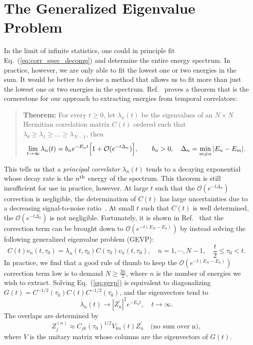 \section{The Generalized Eigenvalue Problem}
In the limit of infinite statistics, one could in principle fit Eq.~(\ref{eq:corr_spec_decomp}) and determine the entire energy spectrum. In practice, however, we are only able to fit the lowest one or two energies in the sum. It would be better to devise a method that allows us to fit more than just the lowest one or two energies in the spectrum. Ref.~\cite{Luscher:1990ck} proves a theorem that is the cornerstone for our approach to extracting energies from temporal correlators:
\begin{quote}
    \textbf{Theorem:} For every $t\geq 0$, 
    let $\lambda_n(t)$
    be the eigenvalues of an $N\times N$ Hermitian correlation matrix $C(t)$ ordered 
    such that
    $\lambda_0\geq \lambda_1\geq \dots\geq \lambda_{N-1}$, then 
    \begin{equation}
       \lim_{t\rightarrow\infty}\lambda_n(t)= b_n e^{-E_n t}\Bigl[1
     + \mathcal O(e^{-t\Delta_n})\Bigr],\qquad b_n>0,\quad
      \Delta_n = \min_{m\neq n}\vert E_n-E_m\vert.
    \label{eq:thmlarget}
    \end{equation}
\end{quote}
This tells us that a \emph{principal correlator} $\lambda_n(t)$ tends to a decaying exponential whose decay rate is the $n^{\rm{th}}$ energy of the spectrum. This theorem is still insufficient for use in practice, however. At large $t$ such that the $\mathcal O(e^{-t\Delta_n})$ correction is negligible, the determination of $C(t)$ has large uncertainties due to a decreasing signal-to-noise ratio~\cite{Lepage:1989hd}. At small $t$ such that $C(t)$ is well determined, the $\mathcal O(e^{-t\Delta_n})$ is not negligible. Fortunately, it is shown in Ref.~\cite{Luscher:1990ck} that the correction term can be brought down to $\mathcal O(e^{-t(E_N - E_n)})$ by instead solving the following generalized eigenvalue problem (GEVP):
\begin{equation}\label{eq:gevp}
    C(t) v_{n}\left(t, \tau_{0}\right)=\lambda_{n}\left(t, \tau_{0}\right) C\left(\tau_{0}\right) v_{n}\left(t, \tau_{0}\right), \quad n=1, \cdots, N-1, \quad \frac{t}{2} \leq \tau_0 < t.
\end{equation}
In practice, we find that a good rule of thumb to keep the $\mathcal O(e^{-t(E_N - E_n)})$ correction term low is to demand $N \geq \frac{3n}{2}$, where $n$ is the number of energies we wish to extract. Solving Eq.~(\ref{eq:gevp}) is equivalent to diagonalizing $G(t) = C^{-1 / 2}\left(\tau_{0}\right) C(t) C^{-1 / 2}\left(\tau_{0}\right)$, and the eigenvectors tend to~\cite{Blossier:2009kd}
\begin{equation}
    \lambda_{n}(t) \rightarrow\left|Z_{n}^{\prime}\right|^{2} e^{-E_{n} t}, \quad t \rightarrow \infty.
\end{equation}
The overlaps are determined by
\begin{equation}
    Z_{j}^{(n)} \approx C_{j k}\left(\tau_{0}\right)^{1 / 2} V_{k n}(t) Z_{n}^{\prime}\quad \text{(no sum over n)},
\end{equation}
where $V$ is the unitary matrix whose columns are the eigenvectors of $G(t)$.
